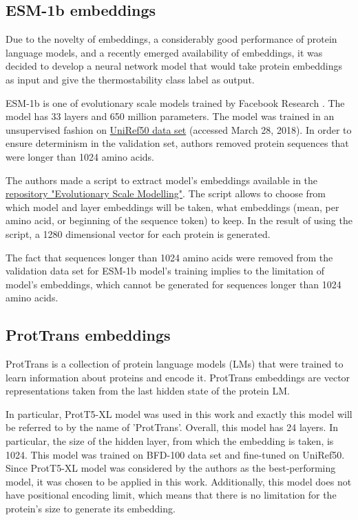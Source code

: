 \documentclass[12pt]{article}
\begin{document}
	\subsection{ESM-1b embeddings}

	Due to the novelty of embeddings, a considerably good performance of
	protein language models, and a recently emerged availability of embeddings,
	it was decided to develop a neural network model that would take protein
	embeddings as input and give the thermostability class
	label as output.

	ESM-1b is one of evolutionary scale models trained by Facebook Research 
	\cite{rives2021biological}. The model has 33 layers and 650 million parameters. 
	The model was trained in an 
	unsupervised fashion on 
	\href{ftp://ftp.uniprot.org/pub/databases/uniprot/uniref/uniref50}{UniRef50 data set}
	(accessed March 28, 2018)\cite{suzek2015uniref}. In order 
	to ensure
	determinism in the validation set, authors removed protein sequences that
	were longer than 1024 amino acids. 

	The authors made a script to extract model's embeddings available in the 
	\href{https://github.com/facebookresearch/esm}{repository "Evolutionary Scale Modelling"}.
	The script allows to choose 
	from which model and layer embeddings will be taken, what embeddings 
	(mean, per amino acid, or beginning of the sequence token) to keep. In the
	result of using the script, a 1280 dimensional vector for each protein is 
	generated.
	
	The fact that sequences longer than 1024 amino acids were removed from the 
	validation data set for ESM-1b model's training implies to the limitation of 
	model's embeddings, which cannot be generated for sequences longer than 
	1024 amino acids.

	\subsection{ProtTrans embeddings}

	ProtTrans \cite{elnaggar2020prottrans} is a collection 
	of protein language models 
	(LMs) that were trained to learn information about 
	proteins and encode it. ProtTrans embeddings are vector 
	representations taken from the last hidden state of 
	the protein LM. 

	In particular, ProtT5-XL model was used in this work and 
	exactly this model will be referred to by the name of 
	'ProtTrans'. Overall, this model has 24 layers. In particular, 
	the size of the hidden layer, from which the 
	embedding is taken, is 1024. This model was trained on 
	BFD-100 data set 
	and fine-tuned on UniRef50. Since ProtT5-XL model was 
	considered by the 
	authors as the best-performing model, it was chosen to be 
	applied in this work. Additionally, this model 
	does not have 
	positional encoding limit, which means that there is no 
	limitation for the protein's size to generate its embedding. 
\end{document}
